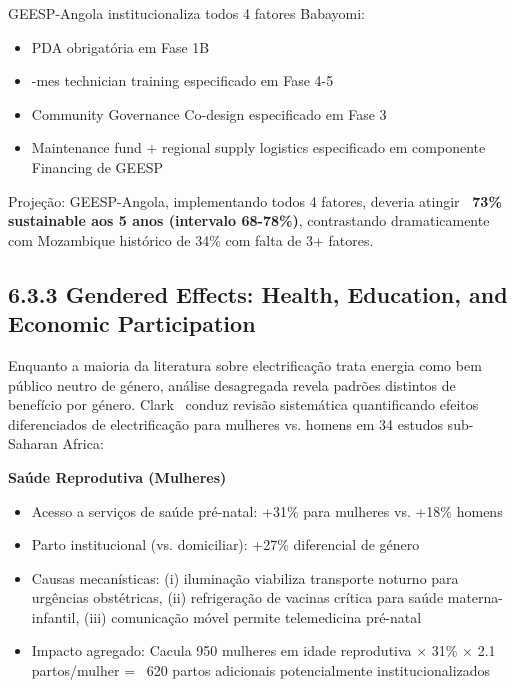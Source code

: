\documentclass[12pt, a4paper]{article}
\begin{document}
GEESP-Angola institucionaliza todos 4 fatores Babayomi:
\begin{itemize}
\item \checkmark PDA obrigatória em Fase 1B
\item {}-mes technician training especificado em Fase 4-5
\item \checkmark Community Governance Co-design especificado em Fase 3
\item \checkmark Maintenance fund + regional supply logistics especificado em componente Financing de GEESP
\end{itemize}

Projeção: GEESP-Angola, implementando todos 4 fatores, deveria atingir \textbf{~73\% sustainable aos 5 anos (intervalo 68-78\%)}, contrastando dramaticamente com Mozambique histórico de 34\% com falta de 3+ fatores.

\subsection*{6.3.3 Gendered Effects: Health, Education, and Economic Participation}

Enquanto a maioria da literatura sobre electrificação trata energia como bem público neutro de género, análise desagregada revela padrões distintos de benefício por género. Clark~\citep{Clark2021} conduz revisão sistemática quantificando efeitos diferenciados de electrificação para mulheres vs. homens em 34 estudos sub-Saharan Africa:

\textbf{Saúde Reprodutiva (Mulheres)}
\begin{itemize}
\item Acesso a serviços de saúde pré-natal: +31\% para mulheres vs. +18\% homens
\item Parto institucional (vs. domiciliar): +27\% diferencial de género
\item Causas mecanísticas: (i) iluminação viabiliza transporte noturno para urgências obstétricas, (ii) refrigeração de vacinas crítica para saúde materna-infantil, (iii) comunicação móvel permite telemedicina pré-natal
\item Impacto agregado: Cacula 950 mulheres em idade reprodutiva × 31\% × 2.1 partos/mulher = ~620 partos adicionais potencialmente institucionalizados
\end{itemize}
\end{document}
